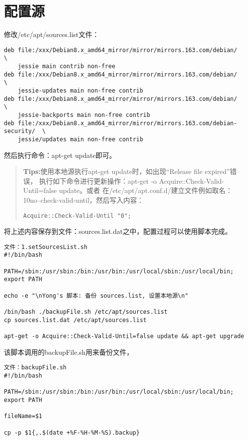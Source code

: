 \section{配置源}
修改/etc/apt/sources.list文件：
\begin{Verbatim}[]
deb file:/xxx/Debian8.x_amd64_mirror/mirror/mirrors.163.com/debian/           \
    jessie main contrib non-free
deb file:/xxx/Debian8.x_amd64_mirror/mirror/mirrors.163.com/debian/           \
    jessie-updates main non-free contrib
deb file:/xxx/Debian8.x_amd64_mirror/mirror/mirrors.163.com/debian/           \
    jessie-backports main non-free contrib
deb file:/xxx/Debian8.x_amd64_mirror/mirror/mirrors.163.com/debian-security/  \
    jessie/updates main non-free contrib
\end{Verbatim}
然后执行命令：apt-get update即可。

\begin{quote}\kaishu
\textbf{Tips:}使用本地源执行apt-get update时，如出现“Release file expired”错误，%
执行如下命令进行更新操作：apt-get -o Acquire::Check-Valid-Until=false update。或者%
在/etc/apt/apt.conf.d/建立文件例如取名：10no--check-valid-until，然后写入内容：%
\begin{Verbatim}[]
Acquire::Check-Valid-Until "0";
\end{Verbatim}
\end{quote}

将上述内容保存到文件：sources.list.dat之中，配置过程可以使用脚本完成。
\begin{Verbatim}[]
文件：1.setSourcesList.sh
#!/bin/bash

PATH=/sbin:/usr/sbin:/bin:/usr/bin:/usr/local/sbin:/usr/local/bin; export PATH

echo -e "\nYong's 脚本: 备份 sources.list, 设置本地源\n"

/bin/bash ./backupFile.sh /etc/apt/sources.list
cp sources.list.dat /etc/apt/sources.list

apt-get -o Acquire::Check-Valid-Until=false update && apt-get upgrade
\end{Verbatim}
该脚本调用的backupFile.sh用来备份文件，
\begin{Verbatim}[]
文件：backupFile.sh
#!/bin/bash

PATH=/sbin:/usr/sbin:/bin:/usr/bin:/usr/local/sbin:/usr/local/bin; export PATH

fileName=$1

cp -p $1{,.$(date +%F-%H-%M-%S).backup}
\end{Verbatim}
